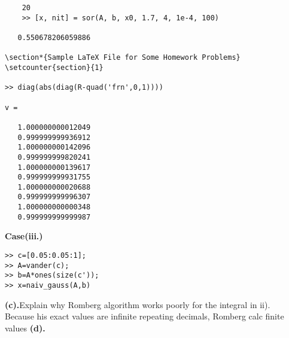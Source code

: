 \begin{verbatim}
    20
    >> [x, nit] = sor(A, b, x0, 1.7, 4, 1e-4, 100)

   0.550678206059886

\section*{Sample LaTeX File for Some Homework Problems}
\setcounter{section}{1}

>> diag(abs(diag(R-quad('frn',0,1))))

v =

   1.000000000012049
   0.999999999936912
   1.000000000142096
   0.999999999820241
   1.000000000139617
   0.999999999931755
   1.000000000020688
   0.999999999996307
   1.000000000000348
   0.999999999999987
\end{verbatim}
\textbf{Case(iii.)}
\begin{verbatim}
>> c=[0.05:0.05:1];
>> A=vander(c);
>> b=A*ones(size(c'));
>> x=naiv_gauss(A,b)

\end{verbatim}
\newpage
\textbf{(c).}Explain why Romberg algorithm works poorly for the integral in ii).\\
Because his exact values are infinite repeating decimals, Romberg calc finite values
\newpage
\textbf{(d).}
